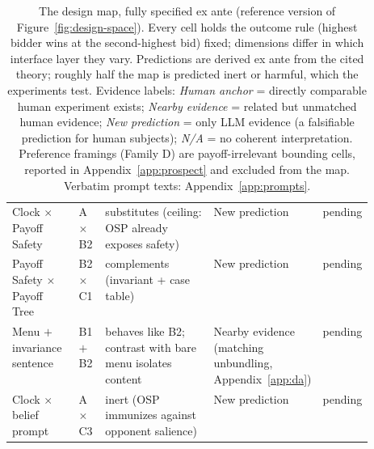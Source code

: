 \begin{table}[htbp]
{\begin{tabular}{@{}llp{0.30\linewidth}p{0.22\linewidth}l@{}}
Clock $\times$ Payoff Safety & A$\times$B2 & substitutes (ceiling: OSP already exposes safety) & New prediction & pending \\
Payoff Safety $\times$ Payoff Tree & B2$\times$C1 & complements (invariant + case table) & New prediction & pending \\
Menu $+$ invariance sentence & B1$+$B2 & behaves like B2; contrast with bare menu isolates content & Nearby evidence (matching unbundling, Appendix~\ref{app:da}) & pending \\
Clock $\times$ belief prompt & A$\times$C3 & inert (OSP immunizes against opponent salience) & New prediction & pending \\
\bottomrule
\end{tabular}}
\caption{The design map, fully specified ex ante (reference version of Figure~\ref{fig:design-space}). Every cell holds the outcome rule (highest bidder wins at the second-highest bid) fixed; dimensions differ in which interface layer they vary. Predictions are derived ex ante from the cited theory; roughly half the map is predicted inert or harmful, which the experiments test. Evidence labels: \emph{Human anchor} = directly comparable human experiment exists; \emph{Nearby evidence} = related but unmatched human evidence; \emph{New prediction} = only LLM evidence (a falsifiable prediction for human subjects); \emph{N/A} = no coherent interpretation. Preference framings (Family D) are payoff-irrelevant bounding cells, reported in Appendix~\ref{app:prospect} and excluded from the map. Verbatim prompt texts: Appendix~\ref{app:prompts}.}
\label{tab:design-space}
\end{table}

